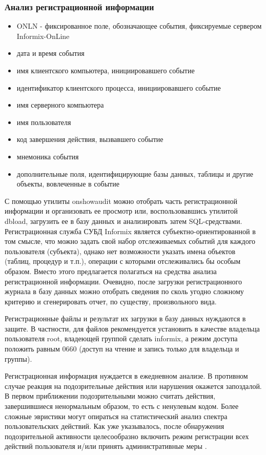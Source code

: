 \subsubsection{Анализ регистрационной информации}
\begin{itemize}
    \item ONLN - фиксированное поле, обозначающее события, фиксируемые сервером Informix-OnLine
    \item дата и время события
    \item имя клиентского компьютера, инициировавшего событие
    \item идентификатор клиентского процесса, инициировавшего событие
    \item имя серверного компьютера
    \item имя пользователя
    \item код завершения действия, вызвавшего событие
    \item мнемоника события
    \item дополнительные поля, идентифицирующие базы данных, таблицы и другие объекты,
        вовлеченные в событие
\end{itemize}

С помощью утилиты onshowaudit можно отобрать часть регистрационной информации и организовать ее
просмотр или, воспользовавшись утилитой dbload, загрузить ее в базу данных и анализировать затем
SQL-средствами. Регистрационная служба СУБД Informix является субъектно-ориентированной в том
смысле, что можно задать свой набор отслеживаемых событий для каждого пользователя (субъекта),
однако нет возможности указать имена объектов (таблиц, процедур и т.п.), операции с которыми
отслеживались бы особым образом. Вместо этого предлагается полагаться на средства анализа
регистрационной информации. Очевидно, после загрузки регистрационного журнала в базу данных можно
отобрать сведения по сколь угодно сложному критерию и сгенерировать отчет, по существу,
произвольного вида.

Регистрационные файлы и результат их загрузки в базу данных нуждаются в защите. В частности, для
файлов рекомендуется установить в качестве владельца пользователя root, владеющей группой сделать
informix, а режим доступа положить равным 0660 (доступ на чтение и запись только для владельца и
группы).

Регистрационная информация нуждается в ежедневном анализе. В противном случае реакция на
подозрительные действия или нарушения окажется запоздалой. В первом приближении подозрительными
можно считать действия, завершившиеся ненормальным образом, то есть с ненулевым кодом. Более
сложные эвристики могут опираться на статистический анализ спектра пользовательских действий. Как
уже указывалось, после обнаружения подозрительной активности целесообразно включить режим
регистрации всех действий пользователя и/или принять административные меры \cite{dbms-security}.

